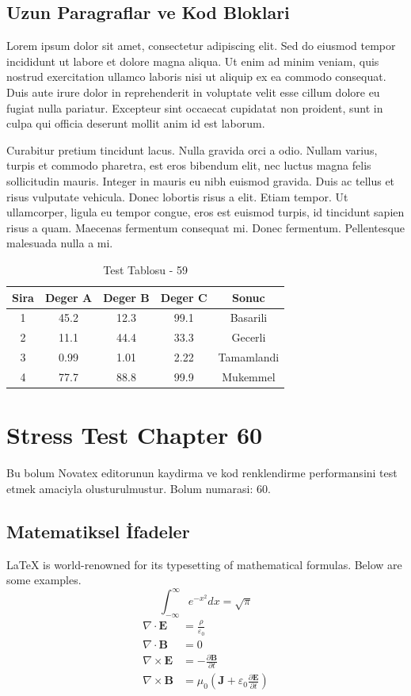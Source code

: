 \documentclass[12pt,a4paper]{article}
\begin{document}
\subsection{Uzun Paragraflar ve Kod Bloklari}
Lorem ipsum dolor sit amet, consectetur adipiscing elit. Sed do eiusmod tempor incididunt ut labore et dolore magna aliqua. Ut enim ad minim veniam, quis nostrud exercitation ullamco laboris nisi ut aliquip ex ea commodo consequat. Duis aute irure dolor in reprehenderit in voluptate velit esse cillum dolore eu fugiat nulla pariatur. Excepteur sint occaecat cupidatat non proident, sunt in culpa qui officia deserunt mollit anim id est laborum.

Curabitur pretium tincidunt lacus. Nulla gravida orci a odio. Nullam varius, turpis et commodo pharetra, est eros bibendum elit, nec luctus magna felis sollicitudin mauris. Integer in mauris eu nibh euismod gravida. Duis ac tellus et risus vulputate vehicula. Donec lobortis risus a elit. Etiam tempor. Ut ullamcorper, ligula eu tempor congue, eros est euismod turpis, id tincidunt sapien risus a quam. Maecenas fermentum consequat mi. Donec fermentum. Pellentesque malesuada nulla a mi.

\begin{table}[h!]
\centering
\begin{tabular}{|c|c|c|c|c|}
\hline
\textbf{Sira} & \textbf{Deger A} & \textbf{Deger B} & \textbf{Deger C} & \textbf{Sonuc} \\
\hline
1 & 45.2 & 12.3 & 99.1 & Basarili \\
2 & 11.1 & 44.4 & 33.3 & Gecerli \\
3 & 0.99 & 1.01 & 2.22 & Tamamlandi \\
4 & 77.7 & 88.8 & 99.9 & Mukemmel \\
\hline
\end{tabular}
\caption{Test Tablosu - 59}
\end{table}

\newpage
\section{Stress Test Chapter 60}
Bu bolum Novatex editorunun kaydirma ve kod renklendirme performansini test etmek amaciyla olusturulmustur. Bolum numarasi: 60.

\subsection{Matematiksel İfadeler}
\LaTeX{} is world-renowned for its typesetting of mathematical formulas. Below are some examples.
\begin{equation}
\int_{-\infty}^{\infty} e^{-x^2} dx = \sqrt{\pi}
\end{equation}
\begin{align}
\nabla \cdot \mathbf{E} &= \frac{\rho}{\varepsilon_0} \\
\nabla \cdot \mathbf{B} &= 0 \\
\nabla \times \mathbf{E} &= -\frac{\partial \mathbf{B}}{\partial t} \\
\nabla \times \mathbf{B} &= \mu_0\left(\mathbf{J} + \varepsilon_0 \frac{\partial \mathbf{E}}{\partial t}\right)
\end{align}
\end{document}
